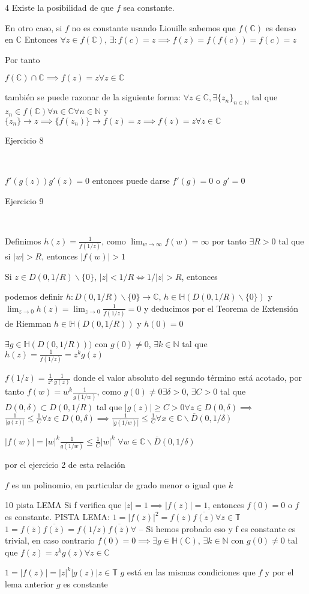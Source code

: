 4 
Existe la posibilidad de que $f$ sea constante.

En otro caso, si $f$ no es constante usando Liouille sabemos que $f(\mathbb{C})$ es denso en $\mathbb{C}$
Entonces
$\forall z\in f(\mathbb{C})$, $\exists  : f(c)=z \implies f(z) = f(f(c)) = f(c) = z$


Por tanto

$f(\mathbb{C}) \cap \mathbb{C} \implies f(z)=z \forall z\in \mathbb{C}$

también se puede razonar de la siguiente forma:
$\forall z\in\mathbb{C}, \exists \{z_n\}_{n\in\mathbb{N}}$ tal que 
$z_n\in f(\mathbb{C}) \forall n\in\mathbb{C} \forall n\in\mathbb{N}$ y $\{z_n\}\rightarrow z \implies \{f(z_n)\}\rightarrow f(z)=z \implies f(z)=z \forall z\in\mathbb{C}$


Ejercicio 8

\

$f'(g(z)) g'(z) = 0 $
entonces puede darse
$f'(g)=0$ o $g'=0$

Ejercicio 9

\

Definimos
$h(z) = \frac{1}{f(1/z)}$, como $\lim_{w\rightarrow\infty}f(w) = \infty$ por tanto $\exists R>0$ tal que si $|w|>R$, entonces $|f(w)|>1$

Si $z\in D(0,1/R)\backslash\{0\}$, $|z|<1/R \Longleftrightarrow 1/|z|>R$, entonces

podemos definir
$h : D(0,1/R)\backslash\{0\} \rightarrow \mathbb{C}$,
$h\in\mathbb{H}(D(0,1/R)\backslash\{0\})$ y $\lim_{z\rightarrow 0} h(z) = \lim_{z\rightarrow 0} \frac{1}{f(1/z)} = 0$
y deducimos por el Teorema de Extensión de Riemman
$h\in\mathbb{H}(D(0,1/R))$ y $h(0)=0$

$\exists g\in\mathbb{H}(D(0,1/R)))$ con $g(0) \not = 0$, $\exists k\in\mathbb{N}$ tal que $h(z) = \frac{1}{f(1/z)} = z^k g(z)$

$ f(1/z) = \frac{1}{z^k}\frac{1}{g(z)}$
donde el valor absoluto del segundo término está acotado, por tanto
$f(w) = w^k \frac{1}{g(1/w)}$,
como $g(0)\not = 0 \exists\delta>0$, $\exists C>0$ tal que $D(0,\delta)\subset D(0,1/R)$ tal que $|g(z)| \geq C > 0 \forall z\in D(0,\delta) \implies$
$\frac{1}{|g(z)|} \leq \frac{1}{C} \forall z\in D(0,\delta) \implies \frac{1}{|g(1/w)|} \leq \frac{1}{C} \forall x\in \mathbb{C}\backslash \overline{D}(0,1/\delta)$

$|f(w)| = |w|^k \frac{1}{g(1/w)} \leq \frac{1}{C}|w|^k$ $\forall w\in \mathbb{C}\backslash\overline{D}(0,1/\delta)$

por el ejercicio 2 de esta relación

$f$ es un polinomio, en particular de grado menor o igual que $k$


10 pista
LEMA
Si f verifica que $|z|=1 \implies |f(z)|=1$, entonces $f(0)=0$ o $f$ es constante.
PISTA LEMA:
$1=|f(z)|^2 = f(z)\overline{f(z)} \forall z\in\mathbb{T}$ 
$1= f(\overline{z})\overline{f(\overline{z})} = f(1/z)\overline{f(\overline{z})}\forall $ 
--
Si hemos probado eso y f es constante es trivial, en caso contrario
$f(0)=0 \implies \exists g\in\mathbb{H}(\mathbb{C})$, $\exists k\in\mathbb{N}$ con $g(0) \not =0$ tal que
$f(z) = z^kg(z) \forall z\in\mathbb{C}$

$1=|f(z)| = |z|^k|g(z)| z\in\mathbb{T}$
$g$ está en las mismas condiciones que $f$ y por el lema anterior $g$ es constante
